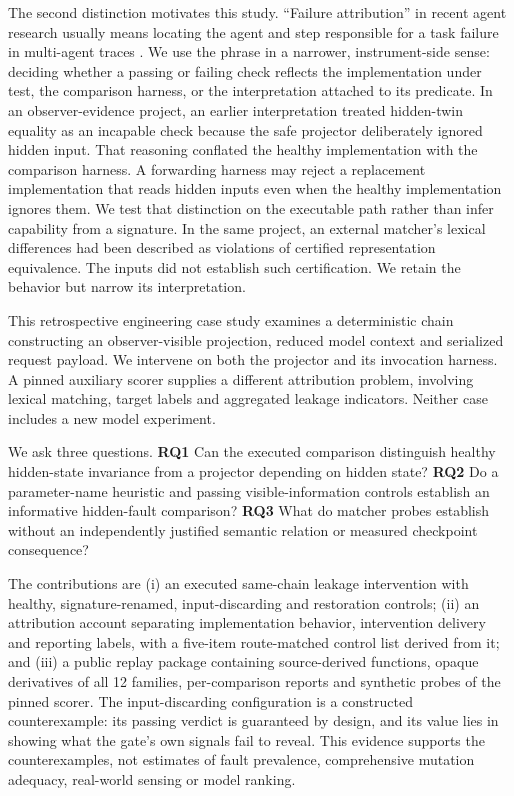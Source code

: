 \documentclass[11pt]{article}
\begin{document}
The second distinction motivates this study. ``Failure attribution'' in recent agent research usually means locating the agent and step responsible for a task failure in multi-agent traces \cite{mast,whowhen}. We use the phrase in a narrower, instrument-side sense: deciding whether a passing or failing check reflects the implementation under test, the comparison harness, or the interpretation attached to its predicate. In an observer-evidence project, an earlier interpretation treated hidden-twin equality as an incapable check because the safe projector deliberately ignored hidden input. That reasoning conflated the healthy implementation with the comparison harness. A forwarding harness may reject a replacement implementation that reads hidden inputs even when the healthy implementation ignores them. We test that distinction on the executable path rather than infer capability from a signature. In the same project, an external matcher's lexical differences had been described as violations of certified representation equivalence. The inputs did not establish such certification. We retain the behavior but narrow its interpretation.

This retrospective engineering case study examines a deterministic chain constructing an observer-visible projection, reduced model context and serialized request payload. We intervene on both the projector and its invocation harness. A pinned auxiliary scorer supplies a different attribution problem, involving lexical matching, target labels and aggregated leakage indicators. Neither case includes a new model experiment.

We ask three questions. \textbf{RQ1} Can the executed comparison distinguish healthy hidden-state invariance from a projector depending on hidden state? \textbf{RQ2} Do a parameter-name heuristic and passing visible-information controls establish an informative hidden-fault comparison? \textbf{RQ3} What do matcher probes establish without an independently justified semantic relation or measured checkpoint consequence?

The contributions are (i) an executed same-chain leakage intervention with healthy, signature-renamed, input-discarding and restoration controls; (ii) an attribution account separating implementation behavior, intervention delivery and reporting labels, with a five-item route-matched control list derived from it; and (iii) a public replay package containing source-derived functions, opaque derivatives of all 12 families, per-comparison reports and synthetic probes of the pinned scorer. The input-discarding configuration is a constructed counterexample: its passing verdict is guaranteed by design, and its value lies in showing what the gate's own signals fail to reveal. This evidence supports the counterexamples, not estimates of fault prevalence, comprehensive mutation adequacy, real-world sensing or model ranking.
\end{document}
